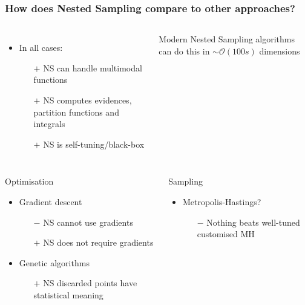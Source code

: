 \documentclass[aspectratio=169]{beamer}
\begin{document}
\begin{frame}
    \frametitle{How does Nested Sampling compare to other approaches?}
    \begin{columns}
        \begin{itemize}
            \item In all cases:
                \begin{itemize}
                    \item[$+$] NS can handle multimodal functions
                    \item[$+$] NS computes evidences, partition functions and integrals
                    \item[$+$] NS is self-tuning/black-box
                \end{itemize}
        \end{itemize}
        Modern Nested Sampling algorithms can do this in $\sim\mathcal{O}(100s)$ dimensions
    \end{columns}
    \begin{columns}[t]
        \begin{block}{Optimisation}
            \begin{itemize}
                \item Gradient descent
                    \begin{itemize}
                        \item[$-$] NS cannot use gradients
                        \item[$+$] NS does not require gradients
                    \end{itemize}
                \item Genetic algorithms
                    \begin{itemize}
                        \item[$+$] NS discarded points have statistical meaning
                    \end{itemize}
            \end{itemize}
        \end{block}
        \begin{block}{Sampling}
            \begin{itemize}
                \item Metropolis-Hastings?
                    \begin{itemize}
                        \item[$-$] Nothing beats well-tuned customised MH

\end{itemize}
\end{itemize}
\end{block}
\end{columns}
\end{frame}
\end{document}
